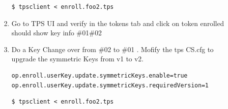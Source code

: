 \documentclass[a4paper]{article}
\begin{document}
\begin{enumerate}[label*=\arabic*.]
\begin{enumerate}[label*=\arabic*.]
\begin{lstlisting}[style=bashInputStyle]
$ tpsclient < enroll.foo2.tps
                    \end{lstlisting}
                \item Go to TPS UI and verify in the tokens tab and click on token enrolled should show key info \#01\#02
                \item Do a Key Change over from \#02 to \#01 . Mofify the tps CS.cfg to upgrade the symmetric Keys from v1 to v2.
                    \begin{lstlisting}
op.enroll.userKey.update.symmetricKeys.enable=true
op.enroll.userKey.update.symmetricKeys.requiredVersion=1
                    \end{lstlisting}
                    \begin{lstlisting}[style=bashInputStyle]
$ tpsclient < enroll.foo2.tps
                    \end{lstlisting}
             \end{enumerate}
    \end{enumerate}                 

\end{document}
